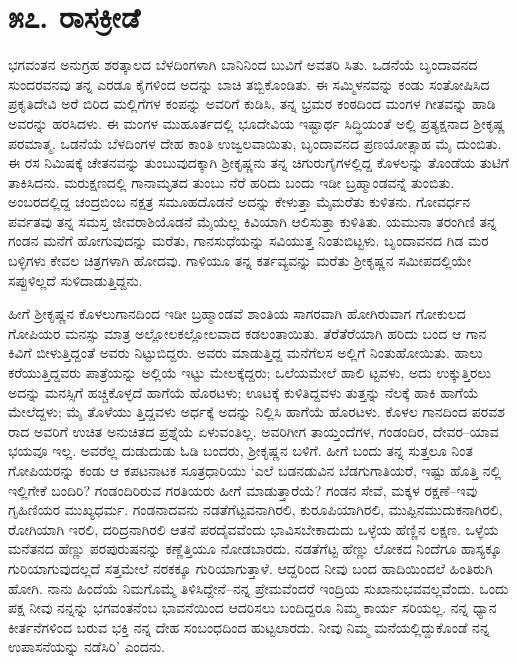 
\chapter{೫೭. ರಾಸಕ್ರೀಡೆ}

ಭಗವಂತನ ಅನುಗ್ರಹ ಶರತ್ಕಾಲದ ಬೆಳದಿಂಗಳಾಗಿ ಬಾನಿನಿಂದ ಬುವಿಗೆ ಅವತರಿ ಸಿತು. ಒಡನೆಯೆ ಬೃಂದಾವನದ ಸುಂದರವನವು ತನ್ನ ಎರಡೂ ಕೈಗಳಿಂದ ಅದನ್ನು ಬಾಚಿ ತಬ್ಬಿಕೊಂಡಿತು. ಈ ಸಮ್ಮಿಳನವನ್ನು ಕಂಡು ಸಂತೋಷಿಸಿದ ಪ್ರಕೃತಿದೇವಿ ಅರೆ ಬಿರಿದ ಮಲ್ಲಿಗೆಗಳ ಕಂಪನ್ನು ಅವರಿಗೆ ಕುಡಿಸಿ, ತನ್ನ ಭ್ರಮರ ಕಂಠದಿಂದ ಮಂಗಳ ಗೀತವನ್ನು ಹಾಡಿ ಅವರನ್ನು ಹರಸಿದಳು. ಈ ಮಂಗಳ ಮುಹೂರ್ತದಲ್ಲಿ ಭೂದೇವಿಯ ಇಷ್ಟಾರ್ಥ ಸಿದ್ಧಿಯಂತೆ ಅಲ್ಲಿ ಪ್ರತ್ಯಕ್ಷನಾದ ಶ್ರೀಕೃಷ್ಣ ಪರಮಾತ್ಮ. ಒಡನೆಯೆ ಬೆಳದಿಂಗಳ ದೇಹ ಕಾಂತಿ ಉಜ್ವಲವಾಯಿತು, ಬೃಂದಾವನದ ಪ್ರಣಯೋತ್ಸಾಹ ಮೈ ದುಂಬಿತು. ಈ ರಸ ನಿಮಿಷಕ್ಕೆ ಚೇತನವನ್ನು ತುಂಬುವುದಕ್ಕಾಗಿ ಶ್ರೀಕೃಷ್ಣನು ತನ್ನ ಚಿಗುರುಗೈಗಳಲ್ಲಿದ್ದ ಕೊಳಲನ್ನು ತೊಂಡೆಯ ತುಟಿಗೆ ತಾಕಿಸಿದನು. ಮರುಕ್ಷಣದಲ್ಲಿ ಗಾನಾಮೃತದ ತುಂಬು ನೆರೆ ಹರಿದು ಬಂದು ಇಡೀ ಬ್ರಹ್ಮಾಂಡವನ್ನೆ ತುಂಬಿತು. ಅಂಬರದಲ್ಲಿದ್ದ ಚಂದ್ರಬಿಂಬ ನಕ್ಷತ್ರ ಸಮೂಹದೊಡನೆ ಅದನ್ನು ಕೇಳುತ್ತಾ ಮೈಮರೆತು ಕುಳಿತನು. ಗೋವರ್ಧನ ಪರ್ವತವು ತನ್ನ ಸಮಸ್ತ ಜೀವರಾಶಿಯೊಡನೆ ಮೈಯೆಲ್ಲ ಕಿವಿಯಾಗಿ ಆಲಿಸುತ್ತಾ ಕುಳಿತಿತು. ಯಮುನಾ ತರಂಗಿಣಿ ತನ್ನ ಗಂಡನ ಮನೆಗೆ ಹೋಗುವುದನ್ನು ಮರೆತು, ಗಾನಸುಧೆಯನ್ನು ಸವಿಯುತ್ತ ನಿಂತುಬಿಟ್ಟಳು. ಬೃಂದಾವನದ ಗಿಡ ಮರ ಬಳ್ಳಿಗಳು ಕೇವಲ ಚಿತ್ರಗಳಾಗಿ ಹೋದವು. ಗಾಳಿಯೂ ತನ್ನ ಕರ್ತವ್ಯವನ್ನು ಮರೆತು ಶ್ರೀಕೃಷ್ಣನ ಸಮೀಪದಲ್ಲಿಯೇ ಸಪ್ಪುಳಿಲ್ಲದೆ ಸುಳಿದಾಡುತ್ತಿದ್ದನು.

ಹೀಗೆ ಶ್ರೀಕೃಷ್ಣನ ಕೊಳಲುಗಾನದಿಂದ ಇಡೀ ಬ್ರಹ್ಮಾಂಡವೆ ಶಾಂತಿಯ ಸಾಗರವಾಗಿ ಹೋಗಿರುವಾಗ ಗೋಕುಲದ ಗೋಪಿಯರ ಮನಸ್ಸು ಮಾತ್ರ ಅಲ್ಲೋಲಕಲ್ಲೋಲವಾದ ಕಡಲಂತಾಯಿತು. ತೆರೆತೆರೆಯಾಗಿ ಹರಿದು ಬಂದ ಆ ಗಾನ ಕಿವಿಗೆ ಬೀಳುತ್ತಿದ್ದಂತೆ ಅವರು ನಿಟ್ಟುಬಿದ್ದರು. ಅವರು ಮಾಡುತ್ತಿದ್ದ ಮನೆಗೆಲಸ ಅಲ್ಲಿಗೆ ನಿಂತುಹೋಯಿತು. ಹಾಲು ಕರೆಯುತ್ತಿದ್ದವರು ಪಾತ್ರೆಯನ್ನು ಅಲ್ಲಿಯೆ ಇಟ್ಟು ಮೇಲಕ್ಕೆದ್ದರು; ಒಲೆಯಮೇಲೆ ಹಾಲಿ ಟ್ಟವಳು, ಅದು ಉಕ್ಕುತ್ತಿರಲು ಅದನ್ನು ಮನಸ್ಸಿಗೆ ಹಚ್ಚಿಕೊಳ್ಳದೆ ಹಾಗೆಯೆ ಹೊರಟಳು; ಊಟಕ್ಕೆ ಕುಳಿತಿದ್ದವಳು ತುತ್ತನ್ನು ನೆಲಕ್ಕೆ ಹಾಕಿ ಹಾಗೆಯೆ ಮೇಲೆದ್ದಳು; ಮೈ ತೊಳೆಯು ತ್ತಿದ್ದವಳು ಅರ್ಧಕ್ಕೆ ಅದನ್ನು ನಿಲ್ಲಿಸಿ ಹಾಗೆಯೆ ಹೊರಟಳು. ಕೊಳಲ ಗಾನದಿಂದ ಪರವಶ ರಾದ ಅವರಿಗೆ ಉಚಿತ ಅನುಚಿತದ ಪ್ರಶ್ನೆಯೆ ಏಳುವಂತಿಲ್ಲ. ಅವರಿಗೀಗ ತಾಯ್ತಂದೆಗಳ, ಗಂಡಂದಿರ, ದೇವರ–ಯಾವ ಭಯವೂ ಇಲ್ಲ. ಅವರೆಲ್ಲ ದುಡುದುಡು ಓಡಿ ಬಂದರು, ಶ್ರೀಕೃಷ್ಣನ ಬಳಿಗೆ. ಹೀಗೆ ಬಂದು ತನ್ನ ಸುತ್ತಲೂ ನಿಂತ ಗೋಪಿಯರನ್ನು ಕಂಡು ಆ ಕಪಟನಾಟಕ ಸೂತ್ರಧಾರಿಯು ‘ಎಲೆ ಬಡನಡುವಿನ ಬೆಡಗುಗಾತಿಯರೆ, ಇಷ್ಟು ಹೊತ್ತಿ ನಲ್ಲಿ ಇಲ್ಲಿಗೇಕೆ ಬಂದಿರಿ? ಗಂಡಂದಿರಿರುವ ಗರತಿಯರು ಹೀಗೆ ಮಾಡುತ್ತಾರೆಯೆ? ಗಂಡನ ಸೇವೆ, ಮಕ್ಕಳ ರಕ್ಷಣೆ–ಇವು ಗೃಹಿಣಿಯರ ಮುಖ್ಯಧರ್ಮ. ಗಂಡನಾದವನು ನಡತೆಗೆಟ್ಟವನಾಗಿರಲಿ, ಕುರೂಪಿಯಾಗಿರಲಿ, ಮುಪ್ಪಿನಮುದುಕನಾಗಿರಲಿ, ರೋಗಿಯಾಗಿ ಇರಲಿ, ದರಿದ್ರನಾಗಿರಲಿ ಆತನೆ ಪರದೈವವೆಂದು ಭಾವಿಸಬೇಕಾದುದು ಒಳ್ಳೆಯ ಹೆಣ್ಣಿನ ಲಕ್ಷಣ. ಒಳ್ಳೆಯ ಮನೆತನದ ಹೆಣ್ಣು ಪರಪುರುಷನನ್ನು ಕಣ್ಣೆತ್ತಿಯೂ ನೋಡಬಾರದು. ನಡತೆಗೆಟ್ಟ ಹೆಣ್ಣು ಲೋಕದ ನಿಂದೆಗೂ ಹಾಸ್ಯಕ್ಕೂ ಗುರಿಯಾಗುವುದಲ್ಲದೆ ಸತ್ತಮೇಲೆ ನರಕಕ್ಕೂ ಗುರಿಯಾಗುತ್ತಾಳೆ. ಆದ್ದರಿಂದ ನೀವು ಬಂದ ಹಾದಿಯಿಂದಲೆ ಹಿಂತಿರುಗಿ ಹೋಗಿ. ನಾನು ಹಿಂದೆಯೆ ನಿಮಗೊಮ್ಮೆ ತಿಳಿಸಿದ್ದೇನೆ–ನನ್ನ ಪ್ರೇಮವೆಂದರೆ ಇಂದ್ರಿಯ ಸುಖಾನುಭವವಲ್ಲವೆಂದು. ಒಂದು ಪಕ್ಷ ನೀವು ನನ್ನನ್ನು ಭಗವಂತನೆಂಬ ಭಾವನೆಯಿಂದ ಆದರಿಸಲು ಬಂದಿದ್ದರೂ ನಿಮ್ಮ ಕಾರ್ಯ ಸರಿಯಲ್ಲ. ನನ್ನ ಧ್ಯಾನ ಕೀರ್ತನೆಗಳಿಂದ ಬರುವ ಭಕ್ತಿ ನನ್ನ ದೇಹ ಸಂಬಂಧದಿಂದ ಹುಟ್ಟಲಾರದು. ನೀವು ನಿಮ್ಮ ಮನೆಯಲ್ಲಿದ್ದುಕೊಂಡೆ ನನ್ನ ಉಪಾಸನೆಯನ್ನು ನಡೆಸಿರಿ’ ಎಂದನು.

